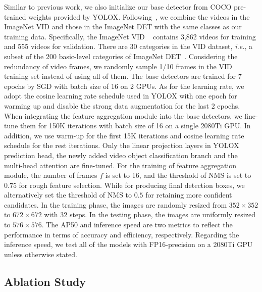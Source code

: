 \documentclass[letterpaper]{article} \usepackage{aaai23}  \usepackage{times}  \usepackage{helvet}  \usepackage{courier}  \usepackage[hyphens]{url}  \usepackage{graphicx} \urlstyle{rm} \def\UrlFont{\rm}  \usepackage{natbib}  \usepackage{caption} \usepackage{xcolor}
\begin{document}
Similar to previous work, we also initialize our base detector from COCO pre-trained weights provided by YOLOX. Following~\cite{zhu2017flow,wu2019sequence,gong2021temporal}, we combine the videos in the ImageNet VID and those in the ImageNet DET with the same classes as our training data. Specifically, the ImageNet VID ~\cite{russakovsky2015imagenet} contains 3,862 videos for training and 555 videos for validation. There are 30 categories in the VID dataset, \emph{i.e.}, a subset of the 200 basic-level categories of ImageNet DET~\cite{russakovsky2015imagenet}.  Considering the redundancy of video frames, we randomly sample 1/10 frames in the VID training set instead of using all of them. The base detectors are trained for 7 epochs by SGD with batch size of 16 on 2 GPUs. As for the learning rate, we adopt the cosine learning rate schedule used in YOLOX with one epoch for warming up and disable the strong data augmentation for the last 2 epochs. When integrating the feature aggregation module into the base detectors, we fine-tune them for 150K iterations with batch size of 16 on a single 2080Ti GPU. In addition, we use warm-up for the first 15K iterations and cosine learning rate schedule for the rest iterations. Only the linear projection layers in YOLOX prediction head, the newly added video object classification branch and the multi-head attention are fine-tuned. For the training of feature aggregation module, the number of frames $f$ is set to 16, and the threshold of NMS is set to $0.75$ for rough feature selection. While for producing final detection boxes, we alternatively set the threshold of NMS to $0.5$ for retaining more confident candidates. In the training phase, the images are randomly resized from $352\times 352$ to $672\times 672$ with 32 steps. In the testing phase, the images are uniformly resized to $576\times576$. The AP50 and inference speed are two metrics to reflect the performance in terms of accuracy and efficiency, respectively. Regarding the inference speed, we test all of the models with FP16-precision on a 2080Ti GPU unless otherwise stated.



\subsection{Ablation Study}
\end{document}
